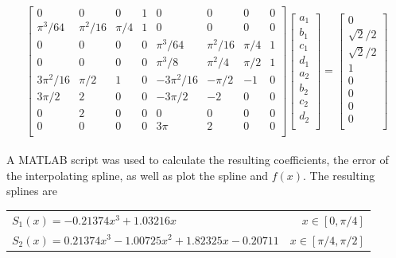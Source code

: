 \documentclass[11pt]{article}
\begin{document}
\begin{enumerate}
\begin{enumerate}[(a)]
				\[
					\begin{bmatrix}
						0 & 0 & 0 & 1 & 0 & 0 & 0 & 0\\
						\pi^3/64 & \pi^2/16 & \pi/4 & 1 & 0 & 0 & 0 & 0\\
						0 & 0 & 0 & 0 & \pi^3/64 & \pi^2/16 & \pi/4 & 1\\
						0 & 0 & 0 & 0 & \pi^3/8 & \pi^2/4 & \pi/2 & 1\\
						3\pi^2/16 & \pi/2 & 1 & 0 & -3\pi^2/16 & -\pi/2 & -1 & 0\\
						3\pi/2 & 2 & 0 & 0 & -3\pi/2 & -2 & 0 & 0\\
						0 & 2 & 0 & 0 & 0 & 0 & 0 & 0\\
						0 & 0 & 0 & 0 & 3\pi & 2 & 0 & 0\\
					\end{bmatrix}
					\begin{bmatrix}
						a_1\\
						b_1\\
						c_1\\
						d_1\\
						a_2\\
						b_2\\
						c_2\\
						d_2\\
					\end{bmatrix}
					=
					\begin{bmatrix}
						0\\
						\sqrt{2}/2\\
						\sqrt{2}/2\\
						1\\
						0\\
						0\\
						0\\
						0\\
					\end{bmatrix}
				\] \\

				A MATLAB script was used to calculate the resulting coefficients, the error of the interpolating spline,
				as well as plot the spline and $f(x)$. The resulting splines are \\

				\begin{center}
				\begin{tabular}{lr}
					$S_1(x) = -0.21374x^3 + 1.03216x$ & $x\in[0,\pi/4]$ \\
					$S_2(x) = 0.21374x^3 - 1.00725x^2 + 1.82325x - 0.20711$ & $x\in[\pi/4,\pi/2]$ \\
				\end{tabular}
				\end{center}


\end{enumerate}
\end{enumerate}
\end{document}
